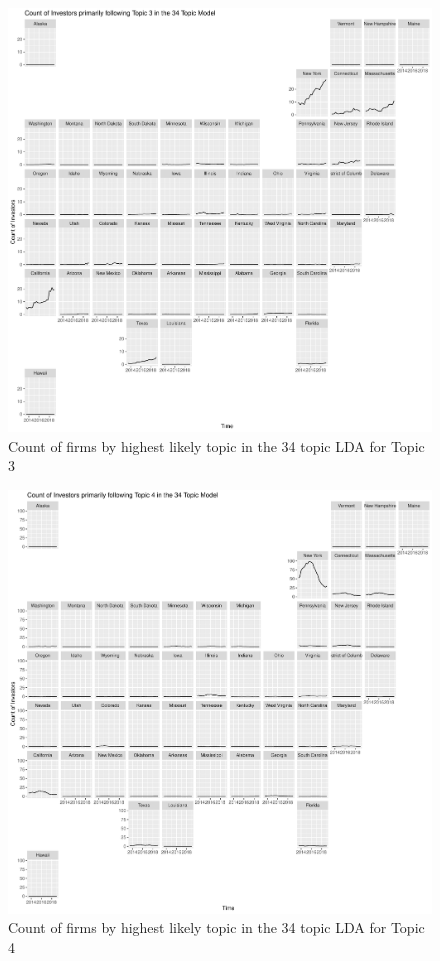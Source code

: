 		\begin{figure}
		\centering
		\includegraphics[width=1\linewidth]{Figures/ChapterV/USA_34_Topic03.pdf}
		\caption[Count of firm for Topic 3 by quarter]{Count of firms by highest likely topic in the 34 topic LDA for Topic 3}
		\label{fig:StateLDA3}
	\end{figure}
	
		\begin{figure}
		\centering
		\includegraphics[width=1\linewidth]{Figures/ChapterV/USA_34_Topic04.pdf}
		\caption[Count of firm for Topic 4 by quarter]{Count of firms by highest likely topic in the 34 topic LDA for Topic 4}
		\label{fig:StateLDA4}
	\end{figure}
	
